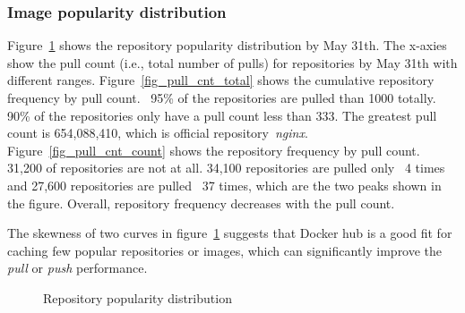 \subsubsection{Image popularity distribution}

Figure~\ref{fig-pop} shows the repository popularity distribution by May 31th. The x-axies show the pull count (i.e., total number of pulls) for repositories by May 31th with different ranges.
Figure~\ref{fig_pull_cnt_total} shows the cumulative repository frequency by pull count. ~95\% of the repositories are pulled than 1000 totally. 90\% of the repositories only have a pull count less than 333. The greatest pull count is 654,088,410, which is official repository~\textit{nginx}. 
Figure~\ref{fig_pull_cnt_count} shows the repository frequency by pull count. 31,200 of repositories are not at all.  
34,100 repositories are pulled only ~4 times and 27,600 repositories are pulled ~37 times, which are the two peaks shown in the figure.
Overall, repository frequency decreases with the pull count.

The skewness of two curves in figure~\ref{fig-pop} suggests that Docker hub is a good fit for caching few popular repositories or images, which can significantly improve the \textit{pull} or \textit{push} performance.      

\begin{figure}[!t]
	\centering
	\caption{Repository popularity distribution}
	\label{fig-pop}
\end{figure}


